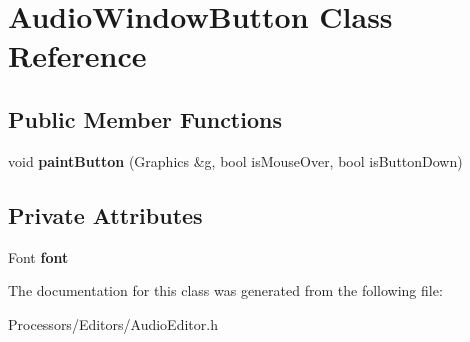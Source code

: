 \hypertarget{classAudioWindowButton}{\section{Audio\-Window\-Button Class Reference}
\label{classAudioWindowButton}
}
\subsection*{Public Member Functions}
\begin{DoxyCompactItemize}
\item 
\hypertarget{classAudioWindowButton_a9970fe887c1f35f09d98c43b98ca2754}{void {\bfseries paint\-Button} (Graphics \&g, bool is\-Mouse\-Over, bool is\-Button\-Down)}\label{classAudioWindowButton_a9970fe887c1f35f09d98c43b98ca2754}

\end{DoxyCompactItemize}
\subsection*{Private Attributes}
\begin{DoxyCompactItemize}
\item 
\hypertarget{classAudioWindowButton_adf671a87ab6c84be204d66c36f77d7f9}{Font {\bfseries font}}\label{classAudioWindowButton_adf671a87ab6c84be204d66c36f77d7f9}

\end{DoxyCompactItemize}


The documentation for this class was generated from the following file\-:\begin{DoxyCompactItemize}
\item 
Processors/\-Editors/Audio\-Editor.\-h\end{DoxyCompactItemize}

